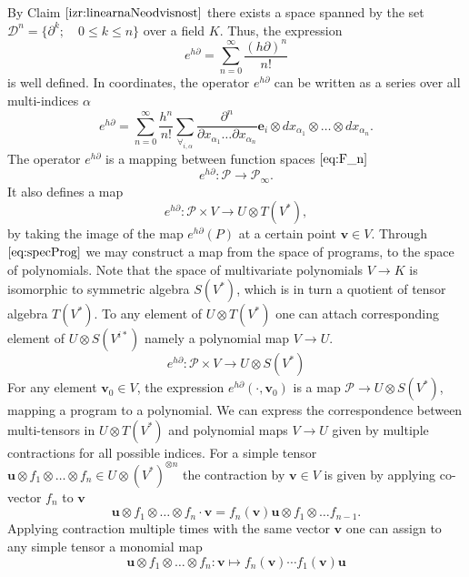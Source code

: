 \documentclass{article}
\newcommand{\e}{\mathbf{e}}
\newcommand{\uu}{\mathbf{u}}
\newcommand{\vv}{\mathbf{v}}
\newcommand{\dP}{\mathcal{P}}
\newcommand{\D}{\partial}
\newcommand{\DD}{\mathcal{D}}
\begin{document}
 By Claim $\ref{izr:linearnaNeodvisnost}$  there exists a space spanned by the set $\DD^n=\{\D^k;\quad 0\le k\le n\}$ over a field $K$. Thus, the expression
 \begin{equation}
 	e^{h\D}=\sum\limits_{n=0}^{\infty}\frac{(h\D)^n}{n!}
 \end{equation}
 is well defined. In coordinates, the operator $e^{h\D}$ can be written as a
 series over all multi-indices $\alpha$
 \begin{equation}\label{eq:e^d}
 	e^{h\D}=\sum\limits_{n=0}^{\infty}\frac{h^n}{n!}\sum_{\forall_{i,\alpha}}\frac{\partial^n}{\partial
 		    x_{\alpha_1}\ldots \partial x_{\alpha_n}}\e_i\otimes
 		  dx_{\alpha_1}\otimes\ldots \otimes dx_{\alpha_n}.
 \end{equation}
The operator $e^{h\D}$ is a mapping between function spaces $\eqref{eq:F_n}$
 \begin{equation}
 	e^{h\D}:\dP\to\dP_\infty.
 \end{equation}
 It also defines a map
  \begin{equation}\label{eq:specProg}
  	e^{h\D}:\dP\times V\to U\otimes T(V^*),
  \end{equation}
by taking the image of the map $e^{h\D}(P)$ at a certain point $\vv\in V$.  
Through $\eqref{eq:specProg}$ we may construct a map from the space of programs,
to the space of polynomials. Note that the space of multivariate polynomials
$V\to K$ is isomorphic to symmetric algebra $S(V^*)$, which is in turn a
quotient of tensor algebra $T(V^*)$. To any element of
 $U\otimes T(V^*)$ one can attach corresponding element of $U\otimes S(V^{i*})$
 namely a polynomial map  $V\to U$.
 \begin{equation}\label{eq:pToPol}
 	e^{h\D}: \dP\times V\to U\otimes S(V^*)
 \end{equation}
 For any element $\vv_0\in V$, the expression $e^{h\D}(\cdot,\vv_0)$ is a map $\dP\to
 U\otimes S(V^*)$, mapping a program to a polynomial. We can express the
 correspondence between multi-tensors in $U\otimes T(V^*)$ and polynomial maps
 $V\to U$ given by multiple contractions for all possible indices. For a simple tensor $\uu\otimes
 f_1\otimes\ldots\otimes f_n\in U\otimes(V^*)^{\otimes n}$ the contraction by
 $\vv\in V$ is given by applying co-vector $f_n$ to $\vv$ 
 \begin{equation}
   \label{eq:contraction}
 \uu\otimes f_1\otimes\ldots\otimes f_n\cdot \vv = f_n(\vv) \uu\otimes f_1\otimes\ldots f_{n-1}.
 \end{equation}
Applying contraction multiple times with the same vector $\vv$ one can assign to
any simple tensor a monomial map 
 \begin{equation}
   \label{eq:tensor->poly}
 \uu\otimes f_1\otimes\ldots\otimes f_n: \vv \mapsto f_n(\vv)\cdots f_1(\vv) \uu
 \end{equation}
\end{document}
